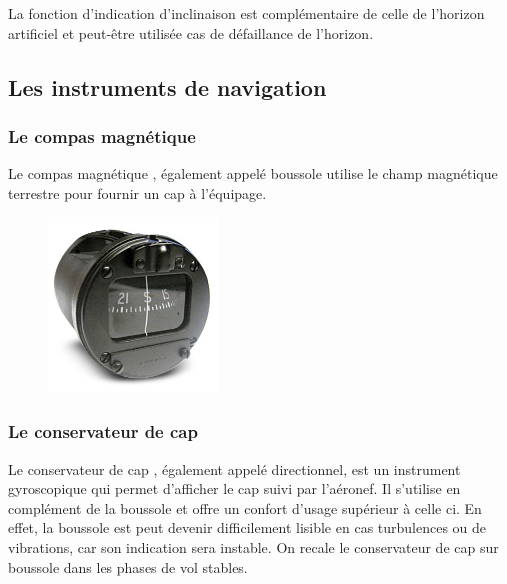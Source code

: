 	La fonction d'indication d'inclinaison est complémentaire de celle de l'horizon artificiel et peut-être utilisée cas de défaillance de l'horizon.
	
	\begin{figure}[H]	
	\centering
	\end{figure}
	
	
	\subsection{Les instruments de navigation}
	\subsubsection{Le compas magnétique}	
	Le \gls{compas magnétique} , également appelé \gls{boussole} utilise le champ magnétique terrestre pour fournir un cap à l'équipage.
	
	\begin{figure}[H]
  	\centering
    \includegraphics[width=0.4\textwidth]{01-EtudeAeronefs/img/compas.jpg}
	\end{figure}	
	
	\subsubsection{Le conservateur de cap}
	
	Le \gls{conservateur de cap} , également appelé directionnel, est un instrument gyroscopique qui permet d'afficher le cap suivi par l'aéronef. Il s'utilise en complément de la boussole et offre un confort d'usage supérieur à celle ci. En effet, la boussole est peut devenir difficilement lisible en cas turbulences ou de vibrations, car son indication sera instable. On recale le conservateur de cap sur boussole dans les phases de vol stables.
	
